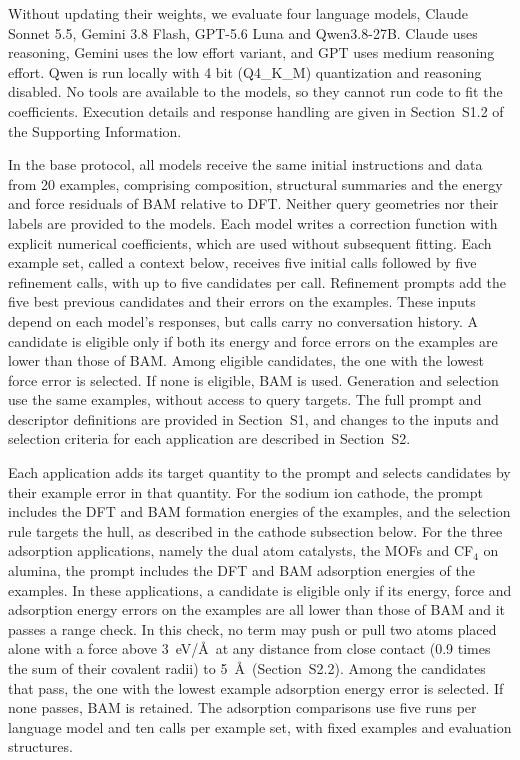 Without updating their weights, we evaluate four language models, Claude Sonnet 5.5,\cite{anthropic2026sonnet55,anthropic2026claudecode} Gemini 3.8 Flash,\cite{google2026gemini38flash} GPT-5.6 Luna and Qwen3.8-27B.\cite{qwen38,llamacpp} Claude uses reasoning, Gemini uses the low effort variant, and GPT uses medium reasoning effort. Qwen is run locally with 4 bit (Q4\_K\_M) quantization and reasoning disabled. No tools are available to the models, so they cannot run code to fit the coefficients. Execution details and response handling are given in Section~S1.2 of the Supporting Information.

In the base protocol, all models receive the same initial instructions and data from 20 examples, comprising composition, structural summaries and the energy and force residuals of BAM relative to DFT. Neither query geometries nor their labels are provided to the models. Each model writes a correction function with explicit numerical coefficients, which are used without subsequent fitting. Each example set, called a context below, receives five initial calls followed by five refinement calls, with up to five candidates per call. Refinement prompts add the five best previous candidates and their errors on the examples. These inputs depend on each model’s responses, but calls carry no conversation history. A candidate is eligible only if both its energy and force errors on the examples are lower than those of BAM. Among eligible candidates, the one with the lowest force error is selected. If none is eligible, BAM is used. Generation and selection use the same examples, without access to query targets. The full prompt and descriptor definitions are provided in Section~S1, and changes to the inputs and selection criteria for each application are described in Section~S2.

Each application adds its target quantity to the prompt and selects candidates by their example error in that quantity. For the sodium ion cathode, the prompt includes the DFT and BAM formation energies of the examples, and the selection rule targets the hull, as described in the cathode subsection below. For the three adsorption applications, namely the dual atom catalysts, the MOFs and CF$_4$ on alumina, the prompt includes the DFT and BAM adsorption energies of the examples. In these applications, a candidate is eligible only if its energy, force and adsorption energy errors on the examples are all lower than those of BAM and it passes a range check. In this check, no term may push or pull two atoms placed alone with a force above 3~eV/\AA\ at any distance from close contact (0.9 times the sum of their covalent radii) to 5~\AA\ (Section~S2.2). Among the candidates that pass, the one with the lowest example adsorption energy error is selected. If none passes, BAM is retained. The adsorption comparisons use five runs per language model and ten calls per example set, with fixed examples and evaluation structures.

